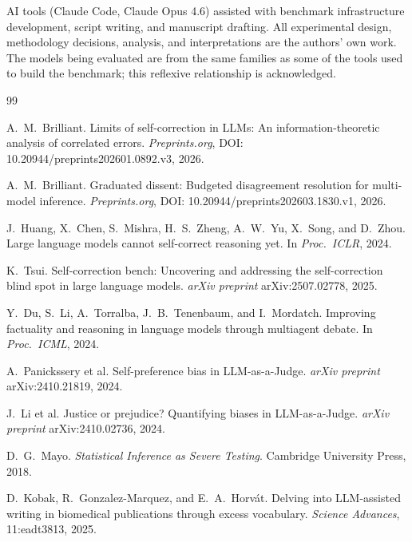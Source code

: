\documentclass[11pt]{article}
\begin{document}
AI tools (Claude Code, Claude Opus 4.6) assisted with benchmark infrastructure development, script writing, and manuscript drafting. All experimental design, methodology decisions, analysis, and interpretations are the authors' own work. The models being evaluated are from the same families as some of the tools used to build the benchmark; this reflexive relationship is acknowledged.

\begin{thebibliography}{99}

A.~M.~Brilliant.
Limits of self-correction in LLMs: An information-theoretic analysis of correlated errors.
\emph{Preprints.org}, DOI: 10.20944/preprints202601.0892.v3, 2026.

A.~M.~Brilliant.
Graduated dissent: Budgeted disagreement resolution for multi-model inference.
\emph{Preprints.org}, DOI: 10.20944/preprints202603.1830.v1, 2026.

J.~Huang, X.~Chen, S.~Mishra, H.~S.~Zheng, A.~W.~Yu, X.~Song, and D.~Zhou.
Large language models cannot self-correct reasoning yet.
In \emph{Proc.\ ICLR}, 2024.

K.~Tsui.
Self-correction bench: Uncovering and addressing the self-correction blind spot in large language models.
\emph{arXiv preprint} arXiv:2507.02778, 2025.

Y.~Du, S.~Li, A.~Torralba, J.~B.~Tenenbaum, and I.~Mordatch.
Improving factuality and reasoning in language models through multiagent debate.
In \emph{Proc.\ ICML}, 2024.

A.~Panickssery et al.
Self-preference bias in LLM-as-a-Judge.
\emph{arXiv preprint} arXiv:2410.21819, 2024.

J.~Li et al.
Justice or prejudice? Quantifying biases in LLM-as-a-Judge.
\emph{arXiv preprint} arXiv:2410.02736, 2024.

D.~G.~Mayo.
\emph{Statistical Inference as Severe Testing}.
Cambridge University Press, 2018.

D.~Kobak, R.~Gonzalez-Marquez, and E.~A.~Horv\'{a}t.
Delving into LLM-assisted writing in biomedical publications through excess vocabulary.
\emph{Science Advances}, 11:eadt3813, 2025.

\end{thebibliography}
\end{document}
